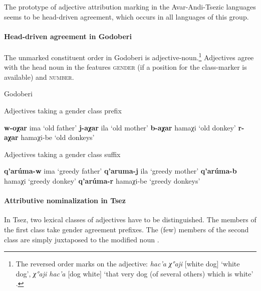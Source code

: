 The prototype of adjective attribution marking in the Avar-Andi-Tsezic languages seems to be head\hyp{}driven agreement, which occurs in all languages of this group.

\paragraph*{Head\hyp{}driven agreement in Godoberi}
The unmarked constituent order in Godoberi is adjective-noun.\footnote{The reversed order marks  on the adjective: \textit{hac'a χ°aji} [white dog] ‘white dog’, \textit{χ°aji hac'a} [dog white] ‘that very dog (of several others) which is white’ \citep[149]{kazenin1996a}.} Adjectives agree with the head noun in the features \textsc{gender} (if a position for the class-marker is available) and \textsc{number}.
\begin{exe}
\ex
\settowidth\jamwidth{[\textsc{n.pl}]}
{\rm Godoberi \citep[25]{tatevosov1996a}}
\begin{xlist}
\ex 
{\rm Adjectives taking a gender class prefix}
\begin{xlist}
\ex \textbf{w-oχar} ima 			{\rm ‘old father’}			\jambox{{\rm [\textsc{m}]}}
\ex \textbf{j-aχar} ila				{\rm ‘old mother’}		\jambox{{\rm [\textsc{f}]}}
\ex \textbf{b-aχar} hamaχi			{\rm ‘old donkey’}		\jambox{{\rm [\textsc{n}]}}
\ex \textbf{r-aχar} hamaχi-be 		{\rm ‘old donkeys’}		\jambox{{\rm [\textsc{n.pl}]}}
\end{xlist}

\ex 
{\rm Adjectives taking a gender class suffix}
\begin{xlist}
\ex \textbf{q'arúma-w} ima			{\rm ‘greedy father’}		\jambox{{\rm [\textsc{m}]}}
\ex \textbf{q'aruma-j} ila			{\rm ‘greedy mother’}		\jambox{{\rm [\textsc{f}]}}
\ex \textbf{q'arúma-b} hamaχi 		{\rm ‘greedy donkey’}		\jambox{{\rm [\textsc{n}]}}
\ex \textbf{q'arúma-r} hamaχi-be	{\rm ‘greedy donkeys’}	\jambox{{\rm [\textsc{n.pl}]}}
\end{xlist}
\end{xlist}
\end{exe}

\paragraph*{Attributive nominalization in Tsez}
In Tsez, two lexical classes of adjectives have to be distinguished. The members of the first class take gender agreement prefixes. The (few) members of the second class are simply juxtaposed to the modified noun \citep[126]{alekseev-etal2004}.

